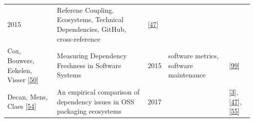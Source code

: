 \documentclass[]{book}
\begin{document}
\begin{longtable}[]{@{}lllll@{}}
\begin{minipage}[t]{0.02\columnwidth}
2015\strut
\end{minipage} & \begin{minipage}[t]{0.24\columnwidth}\raggedright\strut
Referene Coupling, Ecosystems, Technical Dependencies, GitHub,
cross-reference\strut
\end{minipage} & \begin{minipage}[t]{0.16\columnwidth}\raggedright\strut
{[}\protect\hyperlink{ref-Constantinou2017}{47}{]}\strut
\end{minipage}\tabularnewline
\begin{minipage}[t]{0.12\columnwidth}\raggedright\strut
Cox, Bouwers, Eekelen, Visser
{[}\protect\hyperlink{ref-Cox2015}{50}{]}\strut
\end{minipage} & \begin{minipage}[t]{0.31\columnwidth}\raggedright\strut
Measuring Dependency Freshness in Software Systems\strut
\end{minipage} & \begin{minipage}[t]{0.02\columnwidth}\raggedright\strut
2015\strut
\end{minipage} & \begin{minipage}[t]{0.24\columnwidth}\raggedright\strut
software metrics, software maintenance\strut
\end{minipage} & \begin{minipage}[t]{0.16\columnwidth}\raggedright\strut
{[}\protect\hyperlink{ref-Kikas2017}{99}{]}\strut
\end{minipage}\tabularnewline
\begin{minipage}[t]{0.12\columnwidth}\raggedright\strut
Decan, Mens, Claes {[}\protect\hyperlink{ref-Decan2017}{54}{]}\strut
\end{minipage} & \begin{minipage}[t]{0.31\columnwidth}\raggedright\strut
An empirical comparison of dependency issues in OSS packaging
ecosystems\strut
\end{minipage} & \begin{minipage}[t]{0.02\columnwidth}\raggedright\strut
2017\strut
\end{minipage} & \begin{minipage}[t]{0.24\columnwidth}\raggedright\strut
\strut
\end{minipage} & \begin{minipage}[t]{0.16\columnwidth}\raggedright\strut
{[}\protect\hyperlink{ref-Abdalkareem2017}{3}{]},
{[}\protect\hyperlink{ref-Constantinou2017}{47}{]},
{[}\protect\hyperlink{ref-Decan2018}{55}{]}\strut
\end{minipage}\tabularnewline

\end{longtable}
\end{document}
